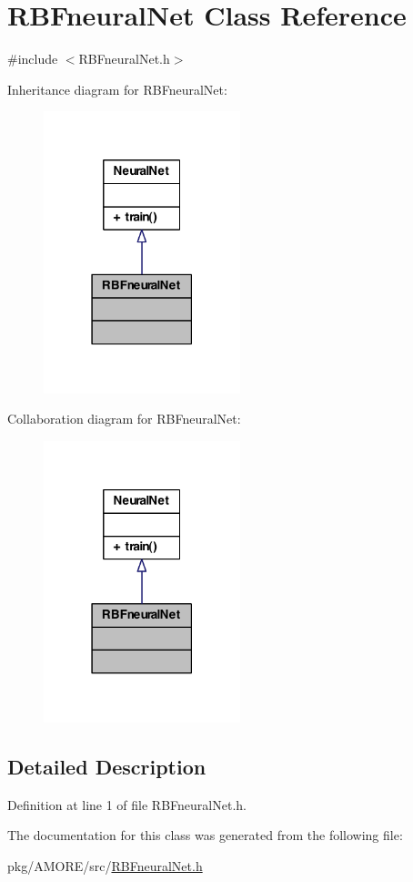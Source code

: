 \hypertarget{class_r_b_fneural_net}{
\section{RBFneuralNet Class Reference}
\label{class_r_b_fneural_net}
}


{\ttfamily \#include $<$RBFneuralNet.h$>$}



Inheritance diagram for RBFneuralNet:
\nopagebreak
\begin{figure}[H]
\begin{center}
\leavevmode
\includegraphics[width=162pt]{class_r_b_fneural_net__inherit__graph}
\end{center}
\end{figure}


Collaboration diagram for RBFneuralNet:
\nopagebreak
\begin{figure}[H]
\begin{center}
\leavevmode
\includegraphics[width=162pt]{class_r_b_fneural_net__coll__graph}
\end{center}
\end{figure}


\subsection{Detailed Description}


Definition at line 1 of file RBFneuralNet.h.



The documentation for this class was generated from the following file:\begin{DoxyCompactItemize}
\item 
pkg/AMORE/src/\hyperlink{_r_b_fneural_net_8h}{RBFneuralNet.h}\end{DoxyCompactItemize}
